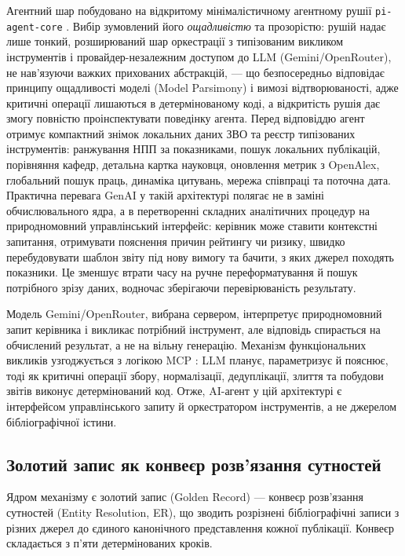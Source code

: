 Агентний шар побудовано на відкритому мінімалістичному агентному рушії \texttt{pi-agent-core} \cite{Zechner2025PiAgentCore}. Вибір зумовлений його \textit{ощадливістю} та прозорістю: рушій надає лише тонкий, розширюваний шар оркестрації з типізованим викликом інструментів і провайдер-незалежним доступом до LLM (Gemini/OpenRouter), не нав'язуючи важких прихованих абстракцій, --- що безпосередньо відповідає принципу ощадливості моделі (Model Parsimony) і вимозі відтворюваності, адже критичні операції лишаються в детермінованому коді, а відкритість рушія дає змогу повністю проінспектувати поведінку агента. Перед відповіддю агент отримує компактний знімок локальних даних ЗВО та реєстр типізованих інструментів: ранжування НПП за показниками, пошук локальних публікацій, порівняння кафедр, детальна картка науковця, оновлення метрик з OpenAlex, глобальний пошук праць, динаміка цитувань, мережа співпраці та поточна дата. Практична перевага GenAI у такій архітектурі полягає не в заміні обчислювального ядра, а в перетворенні складних аналітичних процедур на природномовний управлінський інтерфейс: керівник може ставити контекстні запитання, отримувати пояснення причин рейтингу чи ризику, швидко перебудовувати шаблон звіту під нову вимогу та бачити, з яких джерел походять показники. Це зменшує втрати часу на ручне переформатування й пошук потрібного зрізу даних, водночас зберігаючи перевірюваність результату.

Модель Gemini/OpenRouter, вибрана сервером, інтерпретує природномовний запит керівника і викликає потрібний інструмент, але відповідь спирається на обчислений результат, а не на вільну генерацію. Механізм функціональних викликів узгоджується з логікою MCP \cite{Anthropic2024MCP}: LLM планує, параметризує й пояснює, тоді як критичні операції збору, нормалізації, дедуплікації, злиття та побудови звітів виконує детермінований код. Отже, AI-агент у цій архітектурі є інтерфейсом управлінського запиту й оркестратором інструментів, а не джерелом бібліографічної істини.

\subsection*{Золотий запис як конвеєр розв'язання сутностей}

Ядром механізму є золотий запис (Golden Record) — конвеєр розв'язання сутностей (Entity Resolution, ER), що зводить розрізнені бібліографічні записи з різних джерел до єдиного канонічного представлення кожної публікації. Конвеєр складається з п'яти детермінованих кроків.

